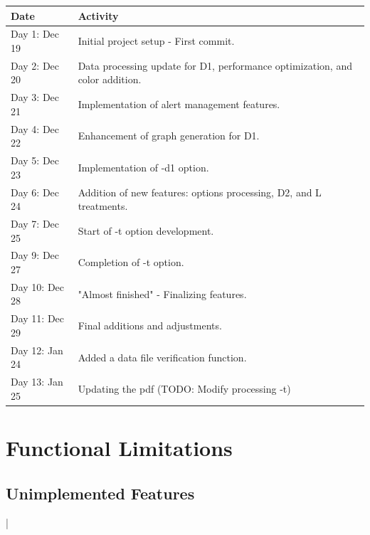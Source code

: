 \documentclass[11pt]{article}
\begin{document}
\begin{tabular}{|l|p{10cm}|}
    \hline
    Date           & Activity                                                                     \\
    \hline
    Day 1: Dec 19  & Initial project setup - First commit.                                        \\
    Day 2: Dec 20  & Data processing update for D1, performance optimization, and color addition. \\
    Day 3: Dec 21  & Implementation of alert management features.                                 \\
    Day 4: Dec 22  & Enhancement of graph generation for D1.                                      \\
    Day 5: Dec 23  & Implementation of -d1 option.                                                \\
    Day 6: Dec 24  & Addition of new features: options processing, D2, and L treatments.          \\
    Day 7: Dec 25  & Start of -t option development.                                              \\
    Day 9: Dec 27  & Completion of -t option.                                                     \\
    Day 10: Dec 28 & "Almost finished" - Finalizing features.                                     \\
    Day 11: Dec 29 & Final additions and adjustments.                                             \\
    Day 12: Jan 24 & Added a data file verification function.                                     \\
    Day 13: Jan 25 & Updating the pdf (TODO: Modify processing -t)                                \\
    \hline
\end{tabular}

\section{Functional Limitations}
\subsection{Unimplemented Features}

\begin{center}
    |
\end{center}
\end{document}
